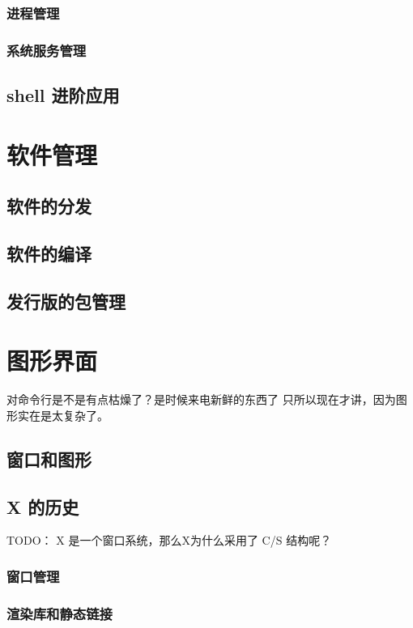 \documentclass[amstex,twoside]{ctexbook}
\begin{document}
\subsection{进程管理	}
\subsection{系统服务管理	}

\section{shell 进阶应用}

\chapter{软件管理}\label{软件管理}

\section{软件的分发}
\section{软件的编译}
\section{发行版的包管理}\label{section:pkgmgr}
	
\chapter{图形界面}
对命令行是不是有点枯燥了？是时候来电新鲜的东西了 只所以现在才讲，因为图形实在是太复杂了。

\section{窗口和图形}

\section{X 的历史}

TODO： X 是一个窗口系统，那么X为什么采用了 C/S 结构呢？
\subsection{ 窗口管理}
\subsection{ 渲染库和静态链接}
\end{document}
